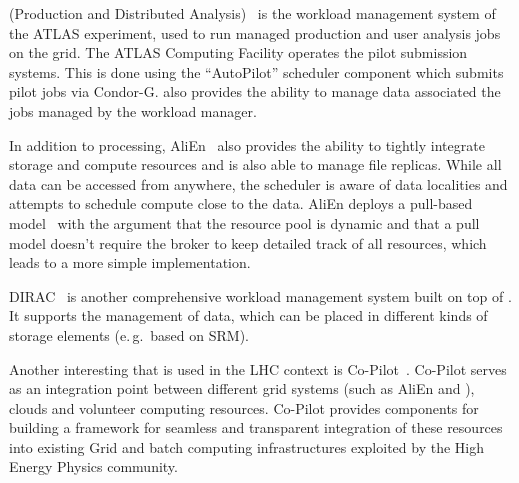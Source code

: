 \documentclass{sig-alternate}
\begin{document}
\panda (Production and Distributed Analysis)~\cite{1742-6596-331-7-072069} is
the workload management system of the ATLAS experiment, used to run managed
production and user analysis jobs on the grid. The ATLAS Computing Facility
operates the pilot submission systems. This is done using the \panda
“AutoPilot” scheduler component which submits pilot jobs via Condor-G. \panda
also provides the ability to manage data associated the jobs managed by the
\panda workload manager.

In addition to processing, AliEn~\cite{1742-6596-119-6-062012} also provides
the ability to tightly integrate storage and compute resources and is also able
to manage file replicas. While all data can be accessed from anywhere, the
scheduler is aware of data localities and attempts to schedule compute close to
the data. AliEn deploys a pull-based model~\cite{Saiz:2003:alien} with the
argument that the resource pool is dynamic and that a pull model doesn't
require the broker to keep detailed track of all resources, which leads to a
more simple implementation.

DIRAC~\cite{1742-6596-219-6-062049} is another comprehensive workload
management system built on top of \pilots. It supports the management of data,
which can be placed in different kinds of storage elements (e.\,g.\ based on
SRM).

Another interesting \pilot that is used in the LHC context is
Co-Pilot~\cite{copilot-tr}. Co-Pilot serves as an integration point between
different grid \pilotjob systems (such as AliEn and \panda), clouds and
volunteer computing resources. Co-Pilot provides components for building a
framework for seamless and transparent integration of these resources into
existing Grid and batch computing infrastructures exploited by the High Energy
Physics community.

\end{document}
